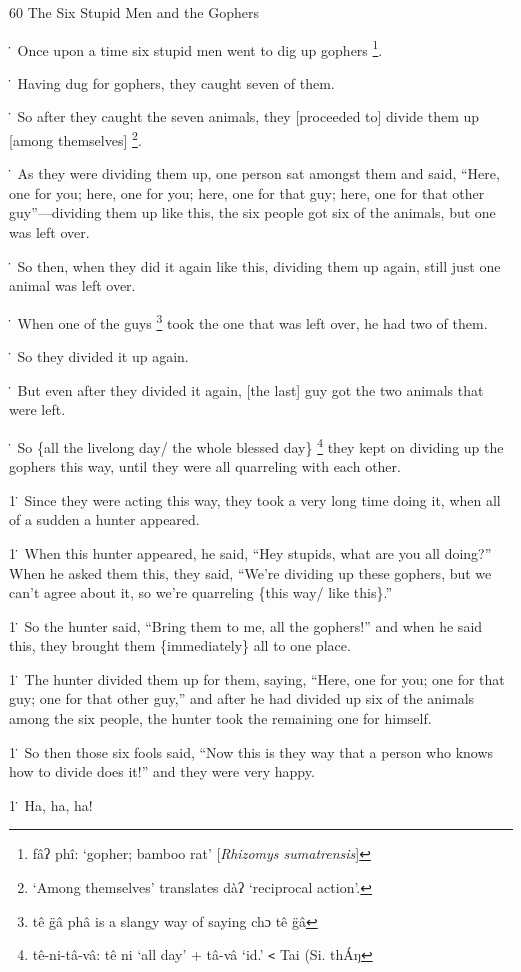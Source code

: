 
60 The Six Stupid Men and the Gophers

\. Once upon a time six stupid men went to dig up gophers \footnote{fâʔ phî: `gopher; bamboo rat' [\textit{Rhizomys sumatrensis}]}.

\. Having dug for gophers, they caught seven of them.

\. So after they caught the seven animals, they [proceeded to] divide them up [among
themselves] \footnote{`Among themselves' translates dàʔ `reciprocal action'.}.

\. As they were dividing them up, one person sat amongst them and said, ``Here,
one for you; here, one for you; here, one for that guy; here, one for that other
guy''---dividing them up like this, the six people got six of the animals, but
one was left over.

\. So then, when they did it again like this, dividing them up again, still just
one animal was left over.

\. When one of the guys \footnote{tê   g̈â   phâ is a slangy way of saying chɔ tê g̈â} took the one that was left over, he had two of them.

\. So they divided it up again.

\. But even after they divided it again, [the last] guy got the two animals that
were left.

\. So \{all the livelong day/ the whole blessed day\} \footnote{tê-ni-tâ-vâ: tê ni `all day' + tâ-vâ `id.' \texttt{<} Tai (Si. thÁŋ} they kept on dividing
up the gophers this way, until they were all quarreling with each other.

1\. Since they were acting this way, they took a very long time doing it, when
all of a sudden a hunter appeared.

1\. When this hunter appeared, he said, ``Hey stupids, what are you all doing?''
When he asked them this, they said, ``We're dividing up these gophers, but we can't
agree about it, so we're quarreling \{this way/ like this\}.''

1\. So the hunter said, ``Bring them to me, all the gophers!'' and when he said
this, they brought them \{immediately\} all to one place.

1\. The hunter divided them up for them, saying, ``Here, one for you; one for that
guy; one for that other guy,'' and after he had divided up six of the animals among
the six people, the hunter took the remaining one for himself.

1\. So then those six fools said, ``Now this is they way that a person who knows
how to divide does it!'' and they were very happy.

1\. Ha, ha, ha!

